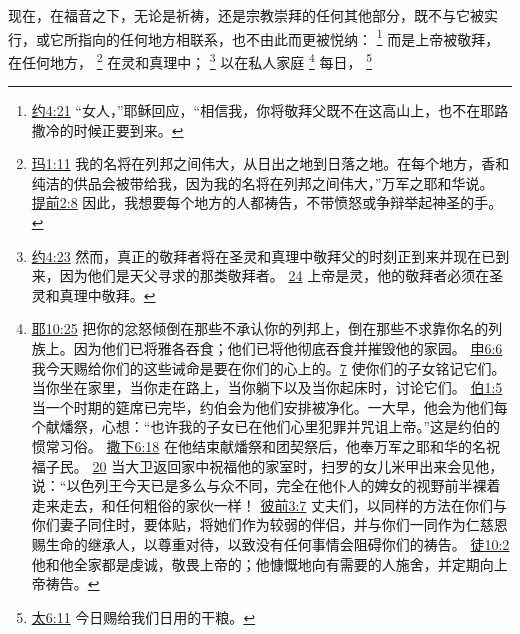 \documentclass[12pt, a4paper, oneside]{ctexart}
\newcounter{parnum}[section]
\newcommand{\N}{%
   \noindent\refstepcounter{parnum}%
    \makebox[\parindent][l]{\textbf{\arabic{parnum}.}}}
\begin{document}
\N 现在，在福音之下，无论是祈祷，还是宗教崇拜的任何其他部分，既不与它被实行，或它所指向的任何地方相联系，也不由此而更被悦纳：
	\footnote {
		\href{https://biblehub.com/john/4-21.htm}{约4:21} “女人，”耶稣回应，“相信我，你将敬拜父既不在这高山上，也不在耶路撒冷的时候正要到来。
	}
	而是上帝被敬拜，在任何地方，
	\footnote {
		\href{https://biblehub.com/malachi/1-11.htm}{玛1:11} 我的名将在列邦之间伟大，从日出之地到日落之地。在每个地方，香和纯洁的供品会被带给我，因为我的名将在列邦之间伟大，”万军之耶和华说。
		\href{https://biblehub.com/1_timothy/2-8.htm}{提前2:8} 因此，我想要每个地方的人都祷告，不带愤怒或争辩举起神圣的手。
	}
	在灵和真理中；
	\footnote {
		\href{https://biblehub.com/john/4-23.htm}{约4:23} 然而，真正的敬拜者将在圣灵和真理中敬拜父的时刻正到来并现在已到来，因为他们是天父寻求的那类敬拜者。
		\href{https://biblehub.com/john/4-24.htm}{24} 上帝是灵，他的敬拜者必须在圣灵和真理中敬拜。
	}
	以在私人家庭
	\footnote {
		\href{https://biblehub.com/jeremiah/10-25.htm}{耶10:25} 把你的忿怒倾倒在那些不承认你的列邦上，倒在那些不求靠你名的列族上。因为他们已将雅各吞食；他们已将他彻底吞食并摧毁他的家园。
		\href{https://biblehub.com/deuteronomy/6-6.htm}{申6:6} 我今天赐给你们的这些诫命是要在你们的心上的。\href{https://biblehub.com/deuteronomy/6-7.htm}{7} 使你们的子女铭记它们。当你坐在家里，当你走在路上，当你躺下以及当你起床时，讨论它们。
		\href{https://biblehub.com/job/1-5.htm}{伯1:5} 当一个时期的筵席已完毕，约伯会为他们安排被净化。一大早，他会为他们每个献燔祭，心想：“也许我的子女已在他们心里犯罪并咒诅上帝。”这是约伯的惯常习俗。
		\href{https://biblehub.com/2_samuel/6-18.htm}{撒下6:18} 在他结束献燔祭和团契祭后，他奉万军之耶和华的名祝福子民。
		\href{https://biblehub.com/2_samuel/6-20.htm}{20} 当大卫返回家中祝福他的家室时，扫罗的女儿米甲出来会见他，说：“以色列王今天已是多么与众不同，完全在他仆人的婢女的视野前半裸着走来走去，和任何粗俗的家伙一样！
		\href{https://biblehub.com/1_peter/3-7.htm}{彼前3:7} 丈夫们，以同样的方法在你们与你们妻子同住时，要体贴，将她们作为较弱的伴侣，并与你们一同作为仁慈恩赐生命的继承人，以尊重对待，以致没有任何事情会阻碍你们的祷告。
		\href{https://biblehub.com/acts/10-2.htm}{徒10:2} 他和他全家都是虔诚，敬畏上帝的；他慷慨地向有需要的人施舍，并定期向上帝祷告。
	}
	每日，
	\footnote {
		\href{https://biblehub.com/matthew/6-11.htm}{太6:11} 今日赐给我们日用的干粮。
	}
\end{document}
